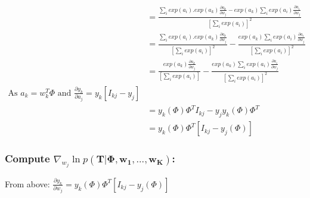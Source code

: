 \documentclass[a4paper]{article}
\begin{document}
\begin{align*}
    &= \frac{\sum_{i}exp(a_{i}).exp(a_{k})\frac{\partial a_k}{\partial w_{j}} - exp(a_{k})\sum_{i}exp(a_{i})\frac{\partial a_{i}}{\partial w_{j}}}
    {\left[\sum_{i}exp(a_{i}) \right]^{2}} \\
    &= \frac{\sum_{i}exp(a_{i}).exp(a_{k})\frac{\partial a_k}{\partial w_{j}}}{\left[\sum_{i}exp(a_{i}) \right]^{2}} - \frac{exp(a_{k})\sum_{i}exp(a_{i})\frac{\partial a_{i}}{\partial w_{j}}}
    {\left[\sum_{i}exp(a_{i}) \right]^{2}} \\
    &= \frac{exp(a_{k})\frac{\partial a_k}{\partial w_{j}}}{\left[\sum_{i}exp(a_{i}) \right]} - \frac{exp(a_{k})\sum_{i}exp(a_{i})\frac{\partial a_{i}}{\partial w_{j}}}
    {\left[\sum_{i}exp(a_{i}) \right]^{2}} \\
    \text{As } a_{k}=w^{T}_{k}\Phi \text{ and } \frac{\partial y_{k}}{\partial a_{j}} = y_{k}[I_{kj} - y_{j}] \\
    &= y_{k}(\Phi)\Phi^{T}I_{kj} - y_{j}y_{k}(\Phi)\Phi^{T}\\
    &= y_{k}(\Phi)\Phi^{T}[I_{kj} - y_{j}(\Phi)]
 \end{align*}{}


\subsubsection*{Compute $\nabla_{w_{j}} \ln{p(\pmb{T}|\pmb{\Phi}, \pmb{w_{1},...,w_{K}})}$:}

From above:
$\frac{\partial y_{k}}{\partial w_{j}} = y_{k}(\Phi)\Phi^{T}[I_{kj} - y_{j}(\Phi)]$
\end{document}
